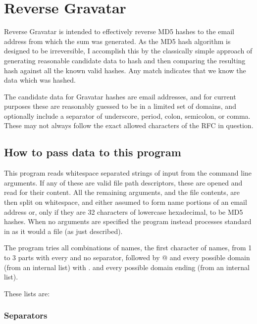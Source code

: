 \section{Reverse Gravatar\label{Reverse_Gravatar}}


Reverse Gravatar is intended to effectively reverse MD5 hashes to the email
address from which the sum was generated. As the MD5 hash algorithm is
designed to be irreversible, I accomplish this by the classically simple
approach of generating reasonable candidate data to hash and then comparing the
resulting hash against all the known valid hashes. Any match indicates that we
know the data which was hashed.



The candidate data for Gravatar hashes are email addresses, and for current
purposes these are reasonably guessed to be in a limited set of domains, and
optionally include a separator of underscore, period, colon, semicolon, or
comma. These may not always follow the exact allowed characters of the
RFC in question.

\subsection*{How to pass data to this program\label{How_to_pass_data_to_this_program}}


This program reads whitespace separated strings of input from the command line
arguments. If any of these are valid file path descriptors, these are opened
and read for their content. All the remaining arguments, and the
file contents, are then split on whitespace, and either assumed to form name
portions of an email address or, only if they are 32 characters of lowercase
hexadecimal, to be MD5 hashes. When no arguments are specified the program
instead processes standard in as it would a file (as just described).



The program tries all combinations of names, the first character of
names, from 1 to 3 parts with every and no separator, followed by @
and every possible domain (from an internal list) with . and every possible
domain ending (from an internal list).



These lists are:

\subsubsection*{Separators\label{Separators}}


